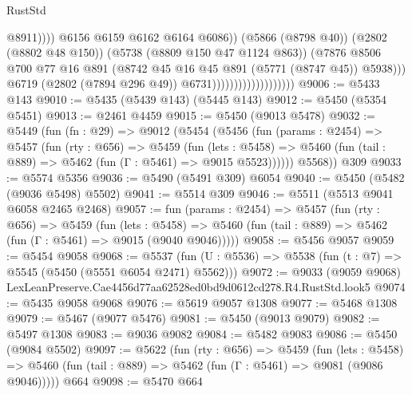 \begin{lexlean}{RustStd}
\begin{coremodule}
                                                        @8911))))
                                                @6156
                                                @6159
                                                @6162
                                                @6164
                                                @6086))
                                            (@5866 (@8798 @40))
                                            (@2802 (@8802 @48 @150))
                                            (@5738 (@8809 @150 @47 @1124 @863))
                                            (@7876
                                              @8506
                                              @700
                                              @77
                                              @16
                                              @891
                                              (@8742 @45 @16 @45 @891 (@5771 (@8747 @45)) @5938)))
                                          @6719
                                          (@2802 (@7894 @296 @49))
                                          @6731)))))))))))))))))))
@9006 := @5433 @143
@9010 := @5435 (@5439 @143) (@5445 @143)
@9012 := @5450 (@5354 @5451)
@9013 := @2461 @4459
@9015 := @5450 (@9013 @5478)
@9032 := @5449
    (fun (fn : @29) =>
    @9012
      (@5454
        (@5456
          (fun (params : @2454) =>
          @5457
            (fun (rty : @656) =>
            @5459
              (fun (lets : @5458) =>
              @5460 (fun (tail : @889) => @5462 (fun (Γ : @5461) => @9015 @5523))))))
        @5568))
    @309
@9033 := @5574 @5356
@9036 := @5490 (@5491 @309) @6054
@9040 := @5450 (@5482 (@9036 @5498) @5502)
@9041 := @5514 @309
@9046 := @5511 (@5513 @9041 @6058 @2465 @2468)
@9057 := fun (params : @2454) =>
  @5457
    (fun (rty : @656) =>
    @5459
      (fun (lets : @5458) =>
      @5460 (fun (tail : @889) => @5462 (fun (Γ : @5461) => @9015 (@9040 @9046)))))
@9058 := @5456 @9057
@9059 := @5454 @9058
@9068 := @5537 (fun (U : @5536) => @5538 (fun (t : @7) => @5545 (@5450 (@5551 @6054 @2471) @5562)))
@9072 := @9033 (@9059 @9068) LexLeanPreserve.Cae4456d77aa62528ed0bd9d0612cd278.R4.RustStd.look5
@9074 := @5435 @9058 @9068
@9076 := @5619 @9057 @1308
@9077 := @5468 @1308
@9079 := @5467 (@9077 @5476)
@9081 := @5450 (@9013 @9079)
@9082 := @5497 @1308
@9083 := @9036 @9082
@9084 := @5482 @9083
@9086 := @5450 (@9084 @5502)
@9097 := @5622
    (fun (rty : @656) =>
    @5459
      (fun (lets : @5458) =>
      @5460 (fun (tail : @889) => @5462 (fun (Γ : @5461) => @9081 (@9086 @9046)))))
    @664
@9098 := @5470 @664

\end{coremodule}
\end{lexlean}
